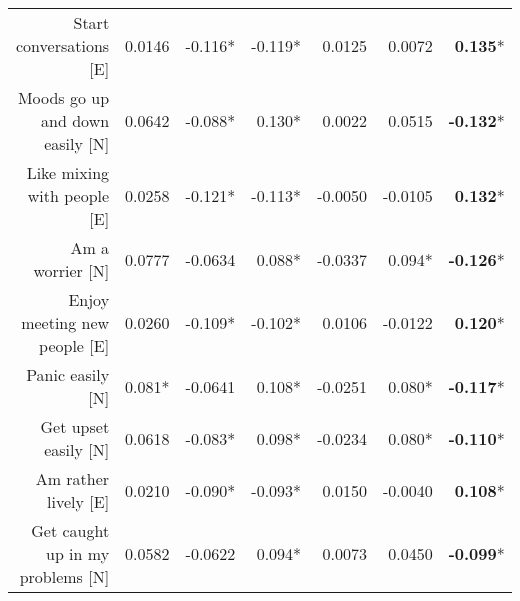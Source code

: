 {\begin{tabular}{rrrrrrr}
Start conversations [E]                                   & 0.0146 &-0.116* &-0.119* & 0.0125 & 0.0072 & \textbf{0.135}*\\
Moods go up and down easily [N]         				  & 0.0642 &-0.088* & 0.130* & 0.0022 & 0.0515 &\textbf{-0.132}*\\
Like mixing with people [E]                               & 0.0258 &-0.121* &-0.113* &-0.0050 &-0.0105 & \textbf{0.132}*\\
Am a worrier [N]                                          & 0.0777 &-0.0634 & 0.088* &-0.0337 & 0.094* &\textbf{-0.126}*\\
Enjoy meeting new people [E]                              & 0.0260 &-0.109* &-0.102* & 0.0106 &-0.0122 & \textbf{0.120}*\\
Panic easily [N]                                          & 0.081* &-0.0641 & 0.108* &-0.0251 & 0.080* &\textbf{-0.117}*\\
Get upset easily [N]                                      & 0.0618 &-0.083* & 0.098* &-0.0234 & 0.080* &\textbf{-0.110}*\\
Am rather lively [E]                                      & 0.0210 &-0.090* &-0.093* & 0.0150 &-0.0040 & \textbf{0.108}*\\
Get caught up in my problems [N]                          & 0.0582 &-0.0622 & 0.094* & 0.0073 & 0.0450 &\textbf{-0.099}*\\
\bottomrule
\end{tabular}
}